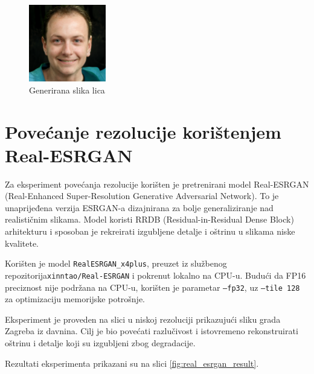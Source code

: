 \documentclass[times, utf8, seminar, numeric]{fer}
\begin{document}
		\begin{figure}[H]
			\centering
			\includegraphics[width=0.3\textwidth]{images/experiment/generation/generated_face.png}
			\caption{Generirana slika lica}
			\label{fig:stylegan3_generated}
		\end{figure}
		
	\section{Povećanje rezolucije korištenjem Real-ESRGAN}
	Za eksperiment povećanja rezolucije korišten je pretrenirani model Real-ESRGAN (Real-Enhanced Super-Resolution Generative Adversarial Network). To je unaprijeđena verzija ESRGAN-a dizajnirana za bolje generaliziranje nad realističnim slikama. Model koristi RRDB (Residual-in-Residual Dense Block) arhitekturu i sposoban je rekreirati izgubljene detalje i oštrinu u slikama niske kvalitete.
	
	Korišten je model \texttt{RealESRGAN\_x4plus}, preuzet iz službenog repozitorija\newline\texttt{xinntao/Real-ESRGAN} i pokrenut lokalno na CPU-u. Budući da FP16 preciznost nije podržana na CPU-u, korišten je parametar \texttt{--fp32}, uz \texttt{--tile 128} za optimizaciju memorijske potrošnje. \cite{wang2021realesrgan}
	
	Eksperiment je proveden na slici u niskoj rezoluciji prikazujući sliku grada Zagreba iz davnina. Cilj je bio povećati razlučivost i istovremeno rekonstruirati oštrinu i detalje koji su izgubljeni zbog degradacije.
	
	Rezultati eksperimenta prikazani su na slici \ref{fig:real_esrgan_result}.
	
\end{document}
